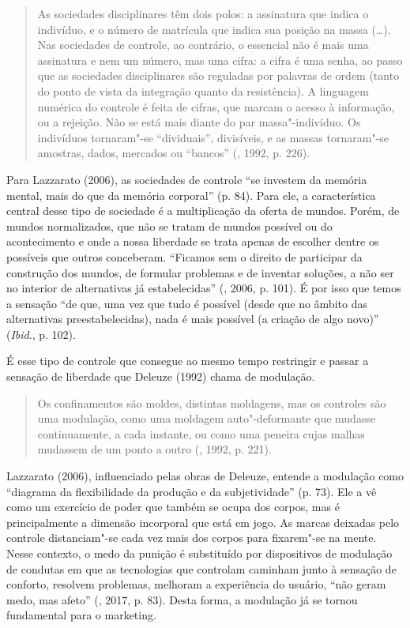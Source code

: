 \begin{quote}
As sociedades disciplinares têm dois polos: a assinatura que indica o
indivíduo, e o número de matrícula que indica sua posição na massa
(\ldots{}). Nas sociedades de controle, ao contrário, o essencial não é mais
uma assinatura e nem um número, mas uma cifra: a cifra é uma senha, ao
passo que as sociedades disciplinares são reguladas por palavras de
ordem (tanto do ponto de vista da integração quanto da resistência). A
linguagem numérica do controle é feita de cifras, que marcam o acesso à
informação, ou a rejeição. Não se está mais diante do par
massa"-indivíduo. Os indivíduos tornaram"-se ``dividuais'', divisíveis, e
as massas tornaram"-se amostras, dados, mercados ou ``bancos'' (,
1992, p. 226).
\end{quote}

Para Lazzarato (2006), as sociedades de controle ``se investem da memória mental, mais do que
da memória corporal'' (p. 84). Para ele, a característica central desse
tipo de sociedade é a multiplicação da oferta de mundos. Porém, de
mundos normalizados, que não se tratam de mundos possível ou do
acontecimento e onde a nossa liberdade se trata apenas de escolher
dentre os possíveis que outros conceberam. ``Ficamos sem o direito de
participar da construção dos mundos, de formular problemas e de inventar
soluções, a não ser no interior de alternativas já estabelecidas''
(, 2006, p. 101).
É por isso que temos a sensação ``de que, uma vez que tudo é possível
(desde que no âmbito das alternativas preestabelecidas), nada é mais
possível (a criação de algo novo)'' (\emph{Ibid}., p. 102).

É esse tipo de controle que consegue ao mesmo tempo restringir e passar
a sensação de liberdade que Deleuze (1992) chama de modulação.

\begin{quote}
Os confinamentos são moldes, distintas moldagens, mas os controles são
uma modulação, como uma moldagem auto"-deformante que mudasse
continuamente, a cada instante, ou como uma peneira cujas malhas
mudassem de um ponto a outro (, 1992, p. 221).
\end{quote}

Lazzarato (2006), influenciado pelas obras de Deleuze, entende a
modulação como ``diagrama da flexibilidade da produção e da
subjetividade'' (p. 73). Ele a vê como um exercício de poder que também se
ocupa dos corpos, mas é principalmente a dimensão incorporal que está em
jogo. As marcas deixadas pelo controle distanciam"-se cada vez mais dos
corpos para fixarem"-se na mente. Nesse contexto, o medo da punição é
substituído por dispositivos de modulação de condutas em que as
tecnologias que controlam caminham junto à sensação de conforto,
resolvem problemas, melhoram a experiência do usuário, ``não geram medo,
mas afeto'' (, 2017, p. 83). Desta forma, a modulação já se tornou
fundamental para o marketing.


